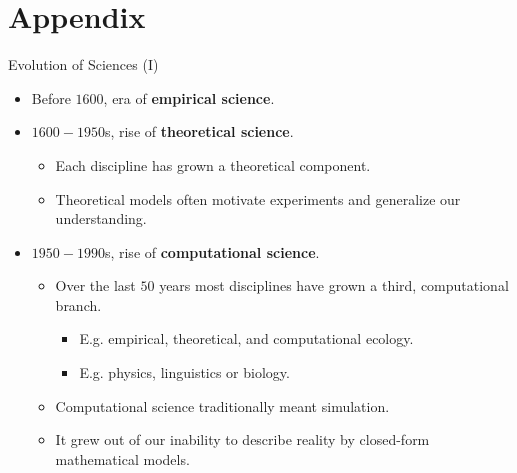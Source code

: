 \section*{Appendix}

\begin{frame}{Evolution of Sciences (I)}
	\begin{itemize}
		\item Before $1600$, era of \textbf{empirical science}.
		\item $1600-1950$s, rise of \textbf{theoretical science}.
		      \begin{itemize}
			      \item Each discipline has grown a theoretical component.
			      \item Theoretical models often motivate experiments and generalize
			            our understanding.
		      \end{itemize}
		\item $1950-1990$s, rise of \textbf{computational science}.
		      \begin{itemize}
			      \item Over the last $50$ years most disciplines have grown a third,
			            computational branch.
			            \begin{itemize}
				            \item E.g. empirical, theoretical, and computational ecology.
				            \item E.g. physics, linguistics or biology.
			            \end{itemize}
			      \item Computational science traditionally meant simulation.
			      \item It grew out of our inability to describe reality by
			            closed-form mathematical models.
		      \end{itemize}
	\end{itemize}
\end{frame}


